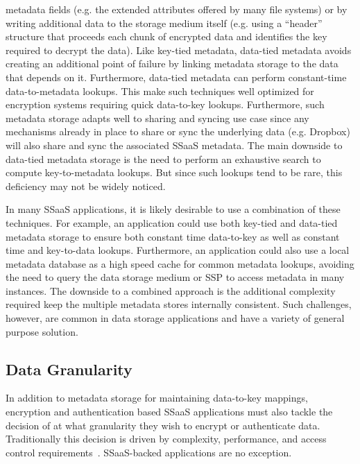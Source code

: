 \begin{packed_desc}
  metadata fields (e.g. the extended attributes offered by many file
  systems) or by writing additional data to the storage medium itself
  (e.g. using a ``header'' structure that proceeds each chunk of
  encrypted data and identifies the key required to decrypt the
  data). Like key-tied metadata, data-tied metadata avoids creating an
  additional point of failure by linking metadata storage to the data
  that depends on it. Furthermore, data-tied metadata can perform
  constant-time data-to-metadata lookups. This make such techniques
  well optimized for encryption systems requiring quick data-to-key
  lookups. Furthermore, such metadata storage adapts well to sharing
  and syncing use case since any mechanisms already in place to share
  or sync the underlying data (e.g. Dropbox) will also share and sync
  the associated SSaaS metadata. The main downside to data-tied
  metadata storage is the need to perform an exhaustive search to
  compute key-to-metadata lookups. But since such lookups tend to be
  rare, this deficiency may not be widely noticed.
\end{packed_desc}

In many SSaaS applications, it is likely desirable to use a
combination of these techniques. For example, an application could use
both key-tied and data-tied metadata storage to ensure both constant
time data-to-key as well as constant time and key-to-data
lookups. Furthermore, an application could also use a local metadata
database as a high speed cache for common metadata lookups, avoiding
the need to query the data storage medium or SSP to access metadata in
many instances. The downside to a combined approach is the additional
complexity required keep the multiple metadata stores internally
consistent. Such challenges, however, are common in data storage
applications and have a variety of general purpose solution.

\subsection{Data Granularity}

In addition to metadata storage for maintaining data-to-key mappings,
encryption and authentication based SSaaS applications must also
tackle the decision of at what granularity they wish to encrypt or
authenticate data. Traditionally this decision is driven by
complexity, performance, and access control
requirements~\cite{li2013}.  SSaaS-backed applications are no
exception.

